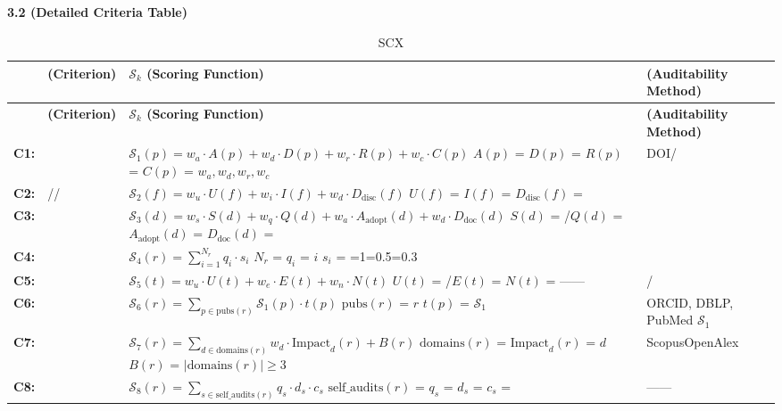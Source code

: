 \documentclass[12pt,a4paper]{article}
\theoremstyle{remark}
\newcommand{\scoreOp}{\mathcal{S}}
\begin{document}
\subsection{}

\noindent
\textbf{3.2  (Detailed Criteria Table)}

\begin{longtable}{p{} p{} p{} p{}}
\caption{SCX} \\
\hline
\textbf{} & \textbf{ (Criterion)} & \textbf{ $\scoreOp_k$ (Scoring Function)} & \textbf{ (Auditability Method)} \\
\hline
\endfirsthead
\hline
\textbf{} & \textbf{ (Criterion)} & \textbf{ $\scoreOp_k$ (Scoring Function)} & \textbf{ (Auditability Method)} \\
\hline
\endhead

\textbf{C1: } &  & $\scoreOp_1(p) = w_a \cdot A(p) + w_d \cdot D(p) + w_r \cdot R(p) + w_c \cdot C(p)$ $A(p)$ = $D(p)$ = $R(p)$ = $C(p)$ =  $w_a, w_d, w_r, w_c$  & DOI/ \\
\hline

\textbf{C2: } & // & $\scoreOp_2(f) = w_u \cdot U(f) + w_i \cdot I(f) + w_d \cdot D_{\text{disc}}(f)$ $U(f)$ = $I(f)$ = $D_{\text{disc}}(f)$ =  &  \\
\hline

\textbf{C3: } &  & $\scoreOp_3(d) = w_s \cdot S(d) + w_q \cdot Q(d) + w_a \cdot A_{\text{adopt}}(d) + w_d \cdot D_{\text{doc}}(d)$ $S(d)$ = /$Q(d)$ = $A_{\text{adopt}}(d)$ = $D_{\text{doc}}(d)$ =  &  \\
\hline

\textbf{C4: } &  & $\scoreOp_4(r) = \sum_{i=1}^{N_r} q_i \cdot s_i$ $N_r$ = $q_i$ =  $i$ $s_i$ = =1=0.5=0.3 &  \\
\hline

\textbf{C5: } &  & $\scoreOp_5(t) = w_u \cdot U(t) + w_e \cdot E(t) + w_n \cdot N(t)$ $U(t)$ = /$E(t)$ = $N(t)$ = —— & / \\
\hline

\textbf{C6: } &  & $\scoreOp_6(r) = \sum_{p \in \text{pubs}(r)} \scoreOp_1(p) \cdot t(p)$ $\text{pubs}(r)$ =  $r$ $t(p)$ =  $\scoreOp_1$  & ORCID, DBLP, PubMed $\scoreOp_1$  \\
\hline

\textbf{C7: } &  & $\scoreOp_7(r) = \sum_{d \in \text{domains}(r)} w_d \cdot \text{Impact}_d(r) + B(r)$ $\text{domains}(r)$ = $\text{Impact}_d(r)$ =  $d$ $B(r)$ =  $|\text{domains}(r)| \geq 3$  & ScopusOpenAlex \\
\hline

\textbf{C8: } &  & $\scoreOp_8(r) = \sum_{s \in \text{self\_audits}(r)} q_s \cdot d_s \cdot c_s$ $\text{self\_audits}(r)$ = $q_s$ = $d_s$ = $c_s$ =  & —— \\
\hline

\end{longtable}
\end{document}
